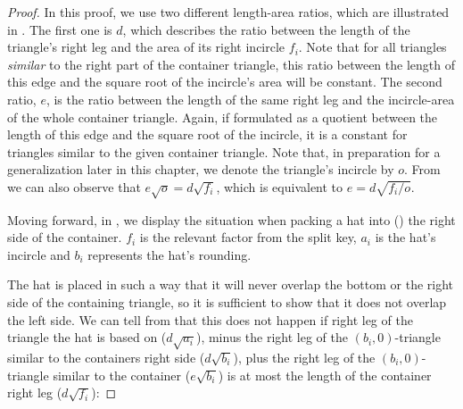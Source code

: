\documentclass[a4paper,style=print,oneside,bibliography=totoc,nexus,lnum,extramargin]{tubsbook}
\begin{document}
\begin{proof}
    In this proof, we use two different length-area ratios, which are illustrated in . The first one is $d$, which describes the ratio between the length of the triangle's right leg and the area of its right incircle $f_i$. Note that for all triangles \emph{similar} to the right part of the container triangle, this ratio between the length of this edge and the square root of the incircle's area will be constant.
    The second ratio, $e$, is the ratio between the length of the same right leg and the incircle-area of the whole container triangle. Again, if formulated as a quotient between the length of this edge and the square root of the incircle, it is a constant for triangles similar to the given container triangle. Note that, in preparation for a generalization later in this chapter, we denote the triangle's incircle by $o$.
    From  we can also observe that
    $e\sqrt{o} = d\sqrt{f_i}$, which is equivalent to $e = d\sqrt{f_i/o}$.




    Moving forward, in , we display the situation when packing a hat into (\wlofg) the right side of the container. $f_i$ is the relevant factor from the split key, $a_i$ is the hat's incircle and $b_i$ represents the hat's rounding.


    The hat is placed in such a way that it will never overlap the bottom or the right side of the containing triangle, so it is sufficient to show that it does not overlap the left side.
    We can tell from  that this does not happen if right leg of the triangle the hat is based on ($d\sqrt{a_i}$), minus the right leg of the $(b_i,0)$-triangle similar to the containers right side ($d\sqrt{b_i}$), plus the right leg of the $(b_i,0)$-triangle similar to the container ($e\sqrt{b_i}$) is at most the length of the container right leg ($d\sqrt{f_i}$):


\end{proof}
\end{document}
